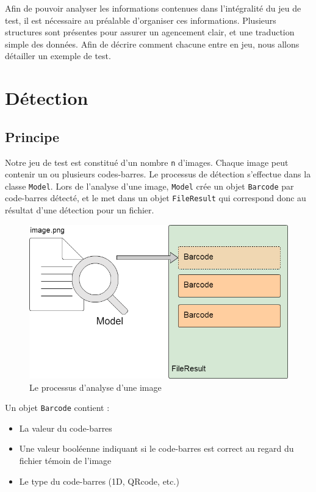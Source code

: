 Afin de pouvoir analyser les informations contenues dans l'intégralité du jeu de test, il est nécessaire au préalable d'organiser ces informations. Plusieurs structures sont présentes pour assurer un agencement clair, et une traduction simple des données. Afin de décrire comment chacune entre en jeu, nous allons détailler un exemple de test.

\section{Détection}

\subsection{Principe}

Notre jeu de test est constitué d'un nombre \verb|n| d'images. Chaque image peut contenir un ou plusieurs codes-barres. Le processus de détection s'effectue dans la classe \verb|Model|. Lors de l'analyse d'une image, \verb|Model| crée un objet \verb|Barcode| par code-barres détecté, et le met dans un objet \verb|FileResult| qui correspond donc au résultat d'une détection pour un fichier.

\begin{figure}
\begin{center}
\includegraphics[scale=0.3]{images/projet1Detection.png}
\end{center}
\caption{Le processus d'analyse d'une image}
\end{figure}

Un objet \verb|Barcode| contient :
\begin{itemize}
\item La valeur du code-barres
\item Une valeur booléenne indiquant si le code-barres est correct au regard du fichier témoin de l'image
\item Le type du code-barres (1D, QRcode, etc.)
\end{itemize}

